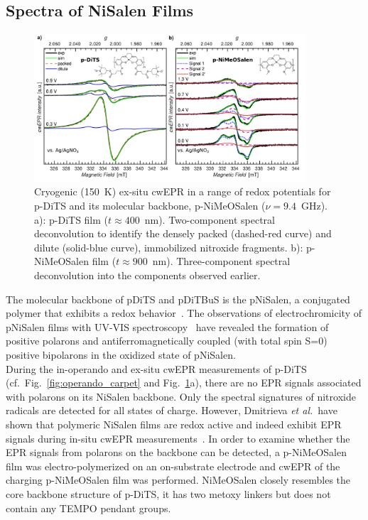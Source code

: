 \subsection{Spectra of NiSalen Films}
\begin{figure}[h]
\centering
	\includegraphics[width=0.9\textwidth]{./operando_epr/figures/Figure_7_EES.pdf}
	\caption{Cryogenic (150~K) ex-situ cwEPR in a range of redox potentials for p-DiTS and its molecular backbone, p-NiMeOSalen ($\nu = 9.4$~GHz). a): p-DiTS film ($t\approx400$~nm). Two-component spectral deconvolution to identify the densely packed (dashed-red curve) and dilute (solid-blue curve), immobilized nitroxide fragments. b): p-NiMeOSalen film ($t\approx900$~nm). Three-component spectral deconvolution into the components observed earlier.\cite{Dmitrieva2018}}
	\label{fig:Figure_7_EES}
\end{figure}


The molecular backbone of pDiTS and pDiTBuS is the pNiSalen, a conjugated polymer that exhibits a redox behavior~\cite{Dmitrieva2018,Vereshchagin2020,Apraksin2021}. The observations of electrochromicity of pNiSalen films with UV-VIS spectroscopy~\cite{Dmitrieva2018} have revealed the formation of positive polarons and antiferromagnetically coupled (with total spin S=0) positive bipolarons in the oxidized state of pNiSalen.\\

During the in-operando and ex-situ cwEPR measurements of p-DiTS (cf.\ Fig.~\ref{fig:operando_carpet} and Fig.~\ref{fig:Figure_7_EES}a), there are no EPR signals associated with polarons on its NiSalen backbone. Only the spectral signatures of nitroxide radicals are detected for all states of charge. However, Dmitrieva \textit{et al.}\ have shown that polymeric NiSalen films are redox active and indeed exhibit EPR signals during in-situ cwEPR measurements~\cite{Dmitrieva2018}. In order to examine whether the EPR signals from polarons on the backbone can be detected, a p-NiMeOSalen film was electro-polymerized on an on-substrate electrode and cwEPR of the charging p-NiMeOSalen film was performed. NiMeOSalen closely resembles the core backbone structure of p-DiTS, it has two metoxy linkers but does not contain any TEMPO pendant groups.

